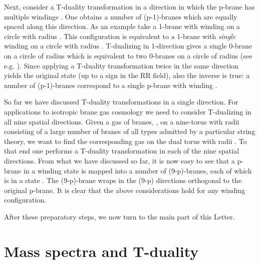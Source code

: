 \documentclass[a4paper,twocolumn,nofootinbib,tightenlines,prd,aps,
               superscriptaddress]{revtex4} %
\providecommand{\al}{\alpha}
\providecommand{\om}{\omega}
\providecommand{\cB}{{\cal{B}}}
\begin{document}
Next, consider a T-duality transformation in a direction in which
the p-brane has multiple windings \myHighlight{$\om_n
> 1$}\coordHE{}. One obtains a number \myHighlight{$\om_n$}\coordHE{} of (p-1)-branes which are
equally spaced along this direction. As an example take a 1-brane
with winding \myHighlight{$\om_1 = 2$}\coordHE{} on a circle with radius \coordHE{}. This
configuration is equivalent to a 1-brane with {\em single} winding
on a circle with radius \coordHE{}. T-dualizing in 1-direction gives a
single 0-brane on a circle of radius \myHighlight{$\al'/2R_1$}\coordHE{} which is
equivalent to two 0-branes  on a circle of radius \myHighlight{$\al'/R_1$}\coordHE{} (see
e.g. \cite{Hashimoto:1998pd}). Since applying a T-duality
transformation twice in the same direction yields the original
state (up to a sign in the RR field), also the inverse is true: a
number \myHighlight{$\om_n$}\coordHE{} of (p-1)-branes correspond to a single p-brane with
winding \myHighlight{$\om_n$}\coordHE{}.


So far we have discussed T-duality transformations in a single
direction. For applications to isotropic brane gas cosmology we
need to consider T-dualizing in all nine spatial directions. Given
a gas of branes, \myHighlight{$\cB$}\coordHE{}, on a nine-torus with radii \coordHE{} consisting of a large number of branes of all types admitted
by a particular string theory, we want to find the corresponding
gas \myHighlight{$\cB^*$}\coordHE{}  on the dual torus \coordHE{} with radii
\coordHE{}. To that end one performs a T-duality
transformation in each of the nine spatial directions. From what
we have discussed so far, it is now easy to see that a p-brane in
a winding state \myHighlight{$\om=(\om_1,\cdots,\om_p,0,\cdots,0)$}\coordHE{} is mapped
into a number \myHighlight{$\om_1 \cdots \om_p$}\coordHE{} of (9-p)-branes, each of which
is in a state \myHighlight{$\om^*=(0,\cdots,0,1,\dots,1)$}\coordHE{}. The (9-p)-brane
wraps in the (9-p) directions orthogonal to the original p-brane.
It is clear that the above considerations hold for any winding
configuration.

After these preparatory steps, we now turn to the main part of this
Letter.



\section{Mass spectra and T-duality}
\label{sec:spectrum}
\end{document}
